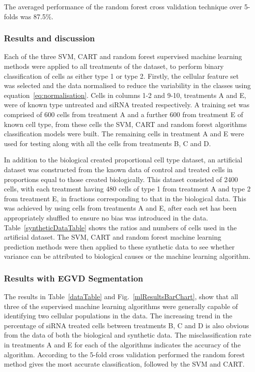 The averaged performance of the random forest cross validation technique over 5-folds was 87.5$\%$.

\subsubsection{Results and discussion}
Each of the three SVM, CART and random forest supervised machine learning methods were applied to all treatments of the dataset, to perform binary classification of cells as either type 1 or type 2. Firstly, the cellular feature set was selected and the data normalised to reduce the variability in the classes using equation~\ref{eq:normalisation}. Cells in columns 1-2 and 9-10, treatments A and E, were of known type untreated and siRNA treated respectively. A training set was comprised of 600 cells from treatment A and a further 600 from treatment E of known cell type, from these cells the SVM, CART and random forest algorithms classification models were built. The remaining cells in treatment A and E were used for testing along with all the cells from treatments B, C and D.

In addition to the biological created proportional cell type dataset, an artificial dataset was constructed from the known data of control and treated cells in proportions equal to those created biologically. This dataset consisted of 2400 cells, with each treatment having 480 cells of type 1 from treatment A and type 2 from treatment E, in fractions corresponding to that in the biological data. This was achieved by using cells from treatments A and E, after each set has been appropriately shuffled to ensure no bias was introduced in the data. Table~\ref{syntheticDataTable} shows the ratios and numbers of cells used in the artificial dataset. The SVM, CART and random forest machine learning prediction methods were then applied to these synthetic data to see whether variance can be attributed to biological causes or the machine learning algorithm.

\subsubsection{Results with EGVD Segmentation}
The results in Table~\ref{dataTable} and Fig.~\ref{mlResultsBarChart}, show that all three of the supervised machine learning algorithms were generally capable of identifying two cellular populations in the data. The increasing trend in the percentage of siRNA treated cells between treatments B, C and D is also obvious from the data of both the biological and synthetic data. The misclassification rate in treatments A and E for each of the algorithms indicates the accuracy of the algorithm. According to the 5-fold cross validation performed the random forest method gives the most accurate classification, followed by the SVM and CART.

